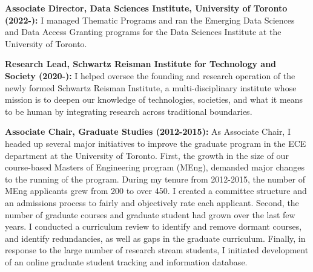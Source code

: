\textbf{Associate Director, Data Sciences Institute, University of Toronto (2022-):} I managed Thematic Programs and ran the Emerging Data Sciences and Data Access Granting programs for the Data Sciences Institute at the University of Toronto.

\textbf{Research Lead, Schwartz Reisman Institute for Technology and Society (2020-):} I helped oversee the founding and research operation of the newly formed Schwartz Reisman Institute, a multi-disciplinary institute whose mission is to deepen our knowledge of technologies, societies, and what it means to be human by integrating research across traditional boundaries.

\textbf{Associate Chair, Graduate Studies (2012-2015):}  As Associate Chair, I headed up several major initiatives to improve the graduate program in the ECE department at the University of Toronto.  First, the growth in the size of our course-based Masters of Engineering program (MEng), demanded major changes to the running of the program.  During my tenure from 2012-2015, the number of MEng applicants grew from 200 to over 450.  I created a committee structure and an admissions process to fairly and objectively rate each applicant.  Second, the number of graduate courses and graduate student had grown over the last few years.  I conducted a curriculum review to identify and remove dormant courses, and identify redundancies, as well as gaps in the graduate curriculum.  Finally, in response to the large number of research stream students, I initiated development of an online graduate student tracking and information database.
